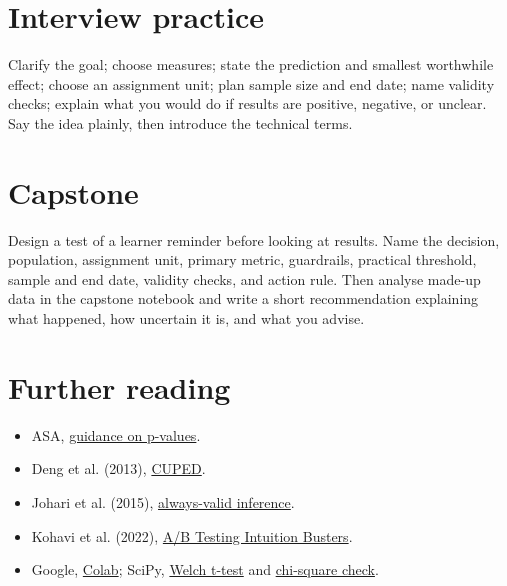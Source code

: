 \documentclass[11pt,a4paper]{article}
\begin{document}
\section*{Interview practice}
Clarify the goal; choose measures; state the prediction and smallest worthwhile effect; choose an assignment unit; plan sample size and end date; name validity checks; explain what you would do if results are positive, negative, or unclear. Say the idea plainly, then introduce the technical terms.

\section*{Capstone}
Design a test of a learner reminder before looking at results. Name the decision, population, assignment unit, primary metric, guardrails, practical threshold, sample and end date, validity checks, and action rule. Then analyse made-up data in the capstone notebook and write a short recommendation explaining what happened, how uncertain it is, and what you advise.

\section*{Further reading}
\begin{itemize}
\item ASA, \href{https://www.amstat.org/asa/files/pdfs/p-valuestatement.pdf}{guidance on p-values}.
\item Deng et al. (2013), \href{https://ai.stanford.edu/~ronnyk/2013-02CUPEDImprovingSensitivityOfControlledExperiments.pdf}{CUPED}.
\item Johari et al. (2015), \href{https://arxiv.org/abs/1512.04922}{always-valid inference}.
\item Kohavi et al. (2022), \href{https://exp-platform.com/abtestingintuitionbusters/}{A/B Testing Intuition Busters}.
\item Google, \href{https://colab.research.google.com/notebooks/intro.ipynb}{Colab}; SciPy, \href{https://docs.scipy.org/doc/scipy/reference/generated/scipy.stats.ttest_ind.html}{Welch t-test} and \href{https://docs.scipy.org/doc/scipy/reference/generated/scipy.stats.chisquare.html}{chi-square check}.
\end{itemize}
\end{document}
